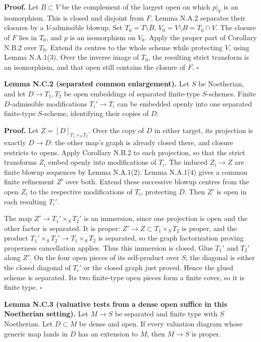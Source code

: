 \documentclass[11pt]{article}
\begin{document}
\textbf{Proof.} Let \(B\subset V\) be the complement of the largest open
on which \(p|_V\) is an isomorphism. This is closed and disjoint from
\(F\). Lemma N.A.2 separates their closures by a \(V\)-admissible
blowup. Set \(T_0=T\setminus\overline B\),
\(V_0=V\setminus B=T_0\cap V\). The closure of \(F\) lies in \(T_0\),
and \(p\) is an isomorphism on \(V_0\). Apply the proper part of
Corollary N.B.2 over \(T_0\). Extend its centres to the whole scheme
while protecting \(V\), using Lemma N.A.1(3). Over the inverse image of
\(T_0\), the resulting strict transform is an isomorphism, and that open
still contains the closure of \(F\). \(\square\)

\textbf{Lemma N.C.2 (separated common enlargement).} Let \(S\) be
Noetherian, and let \(D\to T_1,T_2\) be open embeddings of separated
finite-type \(S\)-schemes. Finite \(D\)-admissible modifications
\(T_i'\to T_i\) can be embedded openly into one separated finite-type
\(S\)-scheme, identifying their copies of \(D\).

\textbf{Proof.} Let \(Z=[D]_{T_1\times_S T_2}\). Over the copy of \(D\)
in either target, its projection is exactly \(D\to D\): the other map's
graph is already closed there, and closure restricts to opens. Apply
Corollary N.B.2 to each projection, so that the strict transforms
\(Z_i\) embed openly into modifications of \(T_i\). The induced
\(Z_i\to Z\) are finite blowup sequences by Lemma N.A.1(2). Lemma
N.A.1(4) gives a common finite refinement \(Z'\) over both. Extend these
successive blowup centres from the open \(Z_i\) to the respective
modifications of \(T_i\), protecting \(D\). Then \(Z'\) is open in each
resulting \(T_i'\).

The map \(Z'\to T_1'\times_S T_2'\) is an immersion, since one
projection is open and the other factor is separated. It is proper:
\(Z'\to Z\subset T_1\times_S T_2\) is proper, and the product
\(T_1'\times_S T_2'\to T_1\times_S T_2\) is separated, so the graph
factorization proving properness cancellation applies. Thus this
immersion is closed. Glue \(T_1'\) and \(T_2'\) along \(Z'\). On the
four open pieces of its self-product over \(S\), the diagonal is either
the closed diagonal of \(T_i'\) or the closed graph just proved. Hence
the glued scheme is separated. Its two finite-type open pieces form a
finite cover, so it is finite type. \(\square\)

\textbf{Lemma N.C.3 (valuative tests from a dense open suffice in this
Noetherian setting).} Let \(M\to S\) be separated and finite type with
\(S\) Noetherian. Let \(D\subset M\) be dense and open. If every
valuation diagram whose generic map lands in \(D\) has an extension to
\(M\), then \(M\to S\) is proper.
\end{document}
